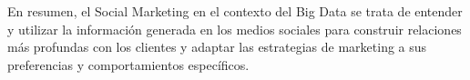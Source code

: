 \documentclass[
    a4paper, %
    10pt, %
    unnumberedsections, %
    twoside, %
]{LTJournalArticle}
\begin{document}
En resumen, el Social Marketing en el contexto del Big Data se trata de entender y utilizar la información generada en los medios sociales para construir relaciones más profundas con los clientes y adaptar las estrategias de marketing a sus preferencias y comportamientos específicos.



\end{document}
